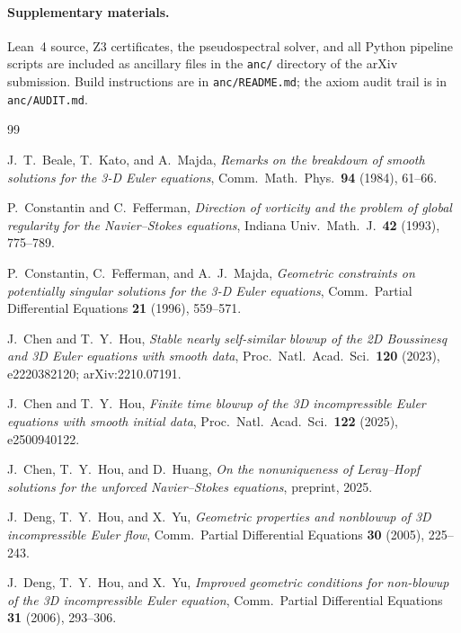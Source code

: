 \documentclass[11pt,a4paper]{article}
\theoremstyle{definition}
\begin{document}

\paragraph{Supplementary materials.}
Lean~4 source, Z3 certificates, the pseudospectral solver, and all
Python pipeline scripts are included as ancillary files in the
\texttt{anc/} directory of the arXiv submission.  Build instructions
are in \texttt{anc/README.md}; the axiom audit trail is in
\texttt{anc/AUDIT.md}.


\begin{thebibliography}{99}

J.~T.~Beale, T.~Kato, and A.~Majda,
\emph{Remarks on the breakdown of smooth solutions for the 3-D Euler equations},
Comm.\ Math.\ Phys.\ \textbf{94} (1984), 61--66.

P.~Constantin and C.~Fefferman,
\emph{Direction of vorticity and the problem of global regularity for the Navier--Stokes equations},
Indiana Univ.\ Math.\ J.\ \textbf{42} (1993), 775--789.

P.~Constantin, C.~Fefferman, and A.~J.~Majda,
\emph{Geometric constraints on potentially singular solutions for the 3-D Euler equations},
Comm.\ Partial Differential Equations \textbf{21} (1996), 559--571.

J.~Chen and T.~Y.~Hou,
\emph{Stable nearly self-similar blowup of the 2D Boussinesq and 3D Euler equations with smooth data},
Proc.\ Natl.\ Acad.\ Sci.\ \textbf{120} (2023), e2220382120;
arXiv:2210.07191.

J.~Chen and T.~Y.~Hou,
\emph{Finite time blowup of the 3D incompressible Euler equations
with smooth initial data},
Proc.\ Natl.\ Acad.\ Sci.\ \textbf{122} (2025), e2500940122.

J.~Chen, T.~Y.~Hou, and D.~Huang,
\emph{On the nonuniqueness of Leray--Hopf solutions for the
unforced Navier--Stokes equations},
preprint, 2025.

J.~Deng, T.~Y.~Hou, and X.~Yu,
\emph{Geometric properties and nonblowup of 3D incompressible Euler flow},
Comm.\ Partial Differential Equations \textbf{30} (2005), 225--243.

J.~Deng, T.~Y.~Hou, and X.~Yu,
\emph{Improved geometric conditions for non-blowup of the 3D incompressible Euler equation},
Comm.\ Partial Differential Equations \textbf{31} (2006), 293--306.


\end{thebibliography}
\end{document}
